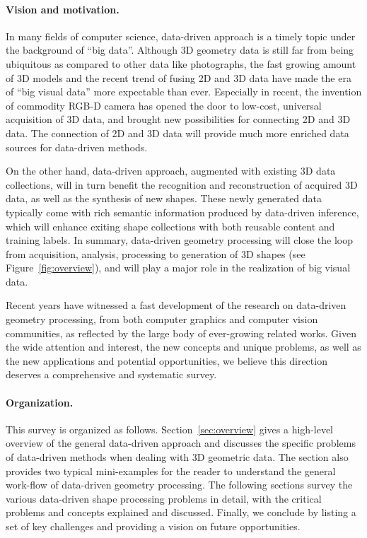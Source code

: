 

\paragraph*{Vision and motivation.}
In many fields of computer science, data-driven approach is a timely topic under the background of ``big data''.
Although 3D geometry data is still far from being ubiquitous as compared to other data like photographs, the fast growing amount of 3D models and the recent trend of fusing 2D and 3D data have made the era of ``big visual data'' more expectable than ever. Especially in recent, the invention of commodity RGB-D camera has opened the door to low-cost, universal acquisition of 3D data, and brought new possibilities for connecting 2D and 3D data. The connection of 2D and 3D data will provide much more enriched data sources for data-driven methods.

On the other hand, data-driven approach, augmented with existing 3D data collections, will in turn benefit the recognition and reconstruction of acquired 3D data, as well as the synthesis of new shapes. These newly generated data typically come with rich semantic information produced by data-driven inference, which will enhance exiting shape collections with both reusable content and training labels.
In summary, data-driven geometry processing will close the loop from acquisition, analysis, processing to generation of 3D shapes (see Figure~\ref{fig:overview}), and will play a major role in the realization of big visual data.

Recent years have witnessed a fast development of the research on data-driven geometry processing, from both computer graphics and computer vision communities, as reflected by the large body of ever-growing related works. Given the wide attention and interest, the new concepts and unique problems, as well as the new applications and potential opportunities, we believe this direction deserves a comprehensive and systematic survey.

\paragraph*{Organization.}
This survey is organized as follows. Section~\ref{sec:overview} gives a high-level overview of the general data-driven approach and discusses the specific problems of data-driven methods when dealing with 3D geometric data. The section also provides two typical mini-examples for the reader to understand the general work-flow of data-driven geometry processing. The following sections survey the various data-driven shape processing problems in detail, with the critical problems and concepts explained and discussed. Finally, we conclude by listing a set of key challenges and providing a vision on future opportunities.

